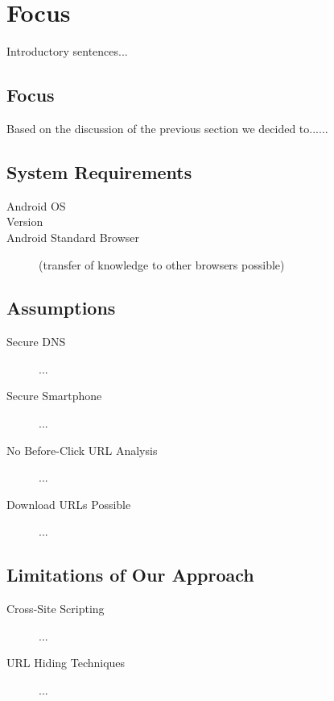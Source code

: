 \section{Focus}
\label{s:assumptions}
Introductory sentences...
\subsection{Focus}
Based on the discussion of the previous section we decided to......
\subsection{System Requirements}
\begin{description}
	\item[Android OS]
	\item[Version]
	\item[Android Standard Browser] (transfer of knowledge to other browsers possible)
\end{description}

\subsection{Assumptions}
\begin{description}
	\item[Secure DNS] ...
	\item[Secure Smartphone] ...
	\item[No Before-Click URL Analysis] ...
	\item[Download URLs Possible] ...
\end{description}

\subsection{Limitations of Our Approach}
\begin{description}
	\item[Cross-Site Scripting] ...
	\item[URL Hiding Techniques] ...
\end{description}

